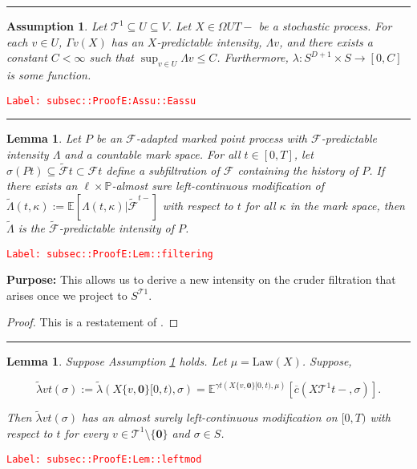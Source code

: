 \documentclass[12pt]{article}
\newcommand{\mb}{\mathbb}
\newcommand{\mc}{\mathcal}
\newcommand{\ra}{\rightarrow}
\newcommand{\ov}{\overline}
\newcommand{\te}{\text}
\newcommand{\tr}{\textcolor{red}}
\newcommand{\labe}[1]{\tr{\texttt{Label: #1}}}
\newcommand{\purpose}{\textbf{Purpose: }}
\newcommand{\lin}{\rule{\linewidth}{0.4 pt}}
\newcommand{\pr}{\mb{P}}							%
\newcommand{\ex}[1]{\mb{E}\left[#1\right]}			%
\newcommand{\exmu}[2]{\mb{E}^{#1}\left[#2\right]}	%
\renewcommand{\root}{\mathbf{0}}				%
\renewcommand{\v}{v}							%
\renewcommand{\U}{U}							%
\renewcommand{\S}{S}							%
\newcommand{\s}{\sigma}							%
\newcommand{\T}{T}								%
\renewcommand{\t}{t}							%
\newcommand{\F}{\mc{F}}							%
\newcommand{\X}{X}								%
\newcommand{\carp}[1]{^{#1}}					%
\newcommand{\const}{C}							%
\newcommand{\degr}{D}							%
\newcommand{\IGrg}{\ov{c}}						%
\newcommand{\tree}{\mc{T}}						%
\newcommand{\sln}[1]{^{#1}}						%
\newcommand{\Sm}{\ell}							%
\newcommand{\alt}[1]{\widetilde{#1}}			%
\newcommand{\m}{\mu}							%
\newcommand{\cm}{\gamma}						%
\newcommand{\law}{\te{Law}}						%
\newcommand{\pmap}{\Gamma}						%
\renewcommand{\mark}{\kappa}					%
\newcommand{\rp}{P}								%
\newcommand{\ratee}{\Lambda}					%
\newcommand{\crate}{\alt{\lambda}}				%
\newcommand{\cratee}{\alt{\Lambda}} 			%
\newtheorem{lem}[thms]{Lemma}
\newtheorem{assu}[thms]{Assumption}
\begin{document}
\lin

\begin{assu}
Let \(\tree\sln{1}\subseteq\U \subseteq V\). Let \(\X{}{}\in \Omega{\U}{\T-}\) be a stochastic process. For each \(\v\in \U\), \(\pmap{\v}(\X{}{})\) has an \(\X{}{}\)-predictable intensity, \(\ratee{\v}\), and there exists a constant \(\const{} < \infty\) such that \(\sup_{\v\in\U} \ratee{\v} \leq \const{}\). Furthermore, \(\lambda: \S\carp{\degr+1}\times \S\ra[0,\const{}]\) is some function.
\label{subsec::ProofE:Assu::Eassu}
\end{assu}
\labe{subsec::ProofE:Assu::Eassu}

\lin

\begin{lem}
Let \(\rp{}\) be an \(\F{}{}\)-adapted marked point process with \(\F{}{}\)-predictable intensity \(\ratee{}\) and a countable mark space. For all \(\t \in [0,\T]\), let \(\sigma(\rp{\t}) \subseteq \alt{\F{}}{\t}\subset \F{}{\t}\) define a subfiltration of \(\F{}{}\) containing the history of \(\rp{}\). If there exists an \(\Sm\times \pr\)-almost sure left-continuous modification of \(\cratee{}{}(\t,\mark{}) := \ex{\ratee{}(\t,\mark{})|\alt{\F{}{}}^{\t-}}\) with respect to \(\t\) for all \(\mark{}\) in the mark space, then \(\cratee{}{}\) is the \(\alt{\F{}{}}\)-predictable intensity of \(\rp{}\).
\label{subsec::ProofE:Lem::filtering}
\end{lem}
\labe{subsec::ProofE:Lem::filtering}

\purpose This allows us to derive a new intensity on the cruder filtration that arises once we project to \(\S\carp{\tree{1}}\).

\begin{proof}
This is a restatement of \cite[Theorem 14.3.III]{DalVer08}.
\end{proof}

\lin

\begin{lem}
Suppose Assumption \ref{subsec::ProofE:Assu::Eassu} holds. Let \(\m{}{}{} = \law(\X{}{})\). Suppose,

\[\crate{\v}{\t}(\s) := \crate{}{}(\X{\{\v,\root\}}{[0,\t)},\s) = \exmu{\cm{\t}(\X{\{\v,\root\}}{[0,\t)},\m{}{}{})}{\IGrg(\X{\tree\sln{1}}{\t-},\s)}.\]


Then \(\crate{\v}{\t}(\s)\) has an almost surely left-continuous modification on \([0,\T)\) with respect to \(\t\) for every \(\v \in \tree\sln{1}\setminus\{\root\}\) and \(\s \in \S\).
\label{subsec::ProofE:Lem::leftmod}
\end{lem}
\labe{subsec::ProofE:Lem::leftmod}
\end{document}
